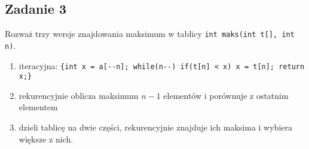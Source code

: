 \documentclass{article}
\begin{document}
\subsection*{Zadanie 3}
Rozważ trzy wersje znajdowania maksimum w tablicy \verb|int maks(int t[], int n)|.
\begin{enumerate}[label=(\alph*)]
    \item iteracyjna: \verb|{int x = a[--n]; while(n--) if(t[n] < x) x = t[n]; return x;}|
    \item rekurencyjnie oblicza maksimum $n-1$ elementów i porównuje z ostatnim elementem
    \item dzieli tablicę na dwie części, rekurencyjnie znajduje ich maksima i wybiera większe
          z nich.
\end{enumerate}
\end{document}
